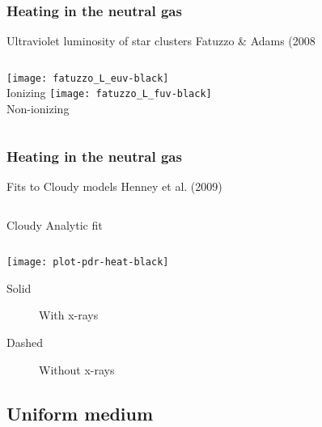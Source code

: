 \documentclass{beamer}
\newcommand\Ref[1]{\textcolor{white!70!black!90!yellow}{#1}}
\begin{document}
\begin{frame}
  \frametitle{Heating in the neutral gas}
  \begin{block}{Ultraviolet luminosity of star clusters}
    \centering
    \Ref{Fatuzzo \& Adams (2008}\medskip
    \begin{columns}
      \centering
      \texttt{[image: fatuzzo\_L\_euv-black]}\\
      Ionizing
      \centering
      \texttt{[image: fatuzzo\_L\_fuv-black]}\\
      Non-ionizing
    \end{columns}
  \end{block}
\end{frame}

\begin{frame}
  \frametitle{Heating in the neutral gas}
  \begin{block}{Fits to Cloudy models}
    \centering
    \Ref{Henney et al.  (2009)}\\ \medskip
    \begin{columns}\medskip
      \centering
      Cloudy
      \centering
      Analytic fit
    \end{columns}
    \texttt{[image: plot-pdr-heat-black]}
    \begin{description}
    \item[Solid] With x-rays
    \item[Dashed] Without x-rays
    \end{description}
  \end{block}
\end{frame}

\subsection{Uniform medium}
\end{document}

